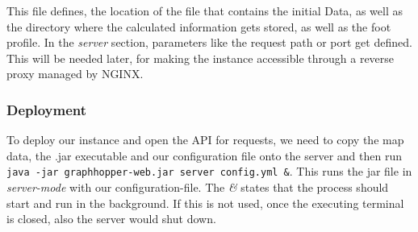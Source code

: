 This file defines, the location of the file that contains the initial Data, as well as the directory where the calculated information gets stored, as well as the foot profile. In the \textit{server} section, parameters like the request path or port get defined. This will be needed later, for making the instance accessible through a reverse proxy managed by NGINX. 

\subsubsection{Deployment}
To deploy our instance and open the API for requests, we need to copy the map data, the .jar executable and our configuration file onto the server and then run \texttt{java -jar graphhopper-web.jar server config.yml \&}. This runs the jar file in \textit{server-mode} with our configuration-file. The \textit{\&} states that the process should start and run in the background. If this is not used, once the executing terminal is closed, also the server would shut down.    
